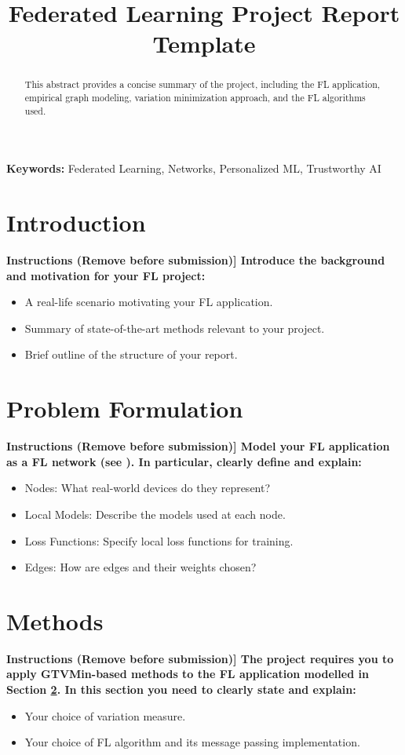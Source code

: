 \documentclass[9pt]{article}
\title{Federated Learning Project Report Template}
\begin{document}
	\maketitle
	
	\begin{abstract}
		This abstract provides a concise summary of the project, including the FL application, empirical graph modeling, variation minimization approach, and the FL algorithms used.
	\end{abstract}
	
	\textbf{Keywords:} Federated Learning, Networks, Personalized ML, Trustworthy AI
	
	\section{Introduction}
	\label{sec:intro}
	{\bf Instructions (Remove before submission)]
		Introduce the background and motivation for your FL project:
		\begin{itemize}
			\item A real-life scenario motivating your FL application.
			\item Summary of state-of-the-art methods relevant to your project.
			\item Brief outline of the structure of your report.
		\end{itemize}}
	
	\section{Problem Formulation}
	\label{sec:pf}
	{\bf Instructions (Remove before submission)]
		Model your FL application as a FL network (see \cite[Ch.~3]{Jung2025}). 
		In particular, clearly define and explain:
		\begin{itemize}
			\item Nodes: What real-world devices do they represent?
			\item Local Models: Describe the models used at each node.
			\item Loss Functions: Specify local loss functions for training.
			\item Edges: How are edges and their weights chosen?
		\end{itemize}}
	
	\section{Methods}
	\label{sec:methods}
{\bf Instructions (Remove before submission)]
	The project requires you to apply GTVMin-based methods to 
	the FL application modelled in Section \ref{sec:pf}. In this section 
	you need to clearly state and explain:
		\begin{itemize}
			\item Your choice of variation measure.
			\item Your choice of FL algorithm and its message passing implementation.
		\end{itemize}}
	
\end{document}
